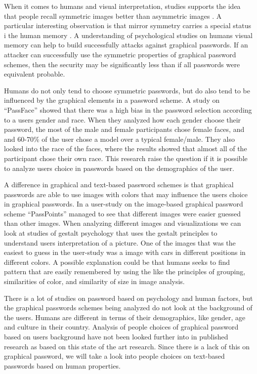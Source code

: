   When it comes to humans and visual interpretation, studies supports the idea that people recall symmetric images better than asymmetric images \cite{Attneave, French}. A particular interesting observation is that mirror symmetry carries a special status i the human memory \cite{Wagemans1}. A understanding of psychological studies on humans visual memory can help to build successfully attacks against graphical passwords. If an attacker can successfully use the symmetric properties of graphical password schemes, then the security may be significantly less than if all passwords were equivalent probable. 

  Humans do not only tend to choose symmetric passwords, but do also tend to be influenced by the graphical elements in a password scheme. A study on ``PassFace'' \cite{Davis} showed that there was a high bias in the password selection according to a users gender and race. When they analyzed how each gender choose their password, the most of the male and female participants chose female faces, and and 60-70\% of the user chose a model over a typical female/male. They also looked into the race of the faces, where the results showed that almost all of the participant chose their own race. This research raise the question if it is possible to analyze users choice in passwords based on the demographics of the user.

  A difference in graphical and text-based password schemes is that graphical passwords are able to use images with colors that may influence the users choice in graphical passwords. In a user-study \cite{Thorpe2} on the image-based graphical password scheme ``PassPoints'' managed to see that different images were easier guessed than other images. When analyzing different images and visualizations we can look at studies of gestalt psychology \cite{Wagemans2} that uses the gestalt principles to understand users interpretation of a picture. One of the images that was the easiest to guess in the user-study was a image with cars in different positions in different colors. A possible explanation could be that humans seeks to find pattern that are easily remembered by using the like the principles of grouping, similarities of color, and similarity of size in image analysis.

  There is a lot of studies on password based on psychology and human factors, but the graphical passwords schemes being analyzed do not look at the background of the users. Humans are different in terms of their demographics, like gender, age and culture in their country. Analysis of people choices of graphical password based on users background have not been looked further into in published research as based on this state of the art research. Since there is a lack of this on graphical password, we will take a look into people choices on text-based passwords based on human properties. 

